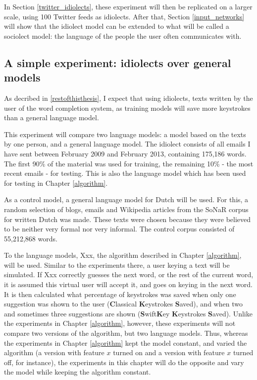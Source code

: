 \documentclass[11pt]{article}
\begin{document}
In Section \ref{twitter_idiolects}, these experiment will then be replicated on a larger scale, using 100 Twitter feeds as idiolects. After that, Section \ref{input_networks} will show that the idiolect model can be extended to what will be called a sociolect model: the language of the people the user often communicates with.

\subsection{A simple experiment: idiolects over general models} \label{simple_exp}

As decribed in \ref{restofthisthesis}, I expect that using idiolects, texts written by the user of the word completion system, as training models will save more keystrokes than a general language model.

This experiment will compare two language models: a model based on the texts by one person, and a general language model. The idiolect consists of all emails I have sent between February 2009 and February 2013, containing 175,186 words. The first 90\% of the material was used for training, the remaining 10\% - the most recent emails - for testing. This is also the language model which has been used for testing in Chapter \ref{algorithm}. 

As a control model, a general language model for Dutch will be used. For this, a random selection of blogs, emails and Wikipedia articles from the SoNaR corpus for written Dutch \cite{oostdijk+13} was made. These texts were chosen because they were believed to be neither very formal nor very informal. The control corpus consisted of 55,212,868 words.

To the language models, Xxx, the algorithm described in Chapter \ref{algorithm}, will be used. Similar to the experiments there, a user keying a text will be simulated. If Xxx correctly guesses the next word, or the rest of the current word, it is assumed this virtual user will accept it, and goes on keying in the next word. It is then calculated what percentage of keystrokes was saved when only one suggestion was shown to the user (\textbf{C}lassical \textbf{K}eystrokes \textbf{S}aved), and when two and sometimes three suggestions are shown (\textbf{S}wift\textbf{K}ey \textbf{K}eystrokes \textbf{S}aved). Unlike the experiments in Chapter \ref{algorithm}, however, these experiments will not compare two versions of the algorithm, but two language models. Thus, whereas the experiments in Chapter \ref{algorithm} kept the model constant, and varied the algorithm (a version with feature $x$ turned on and a version with feature $x$ turned off, for instance), the experiments in this chapter will do the opposite and vary the model while keeping the algorithm constant. 
\end{document}
